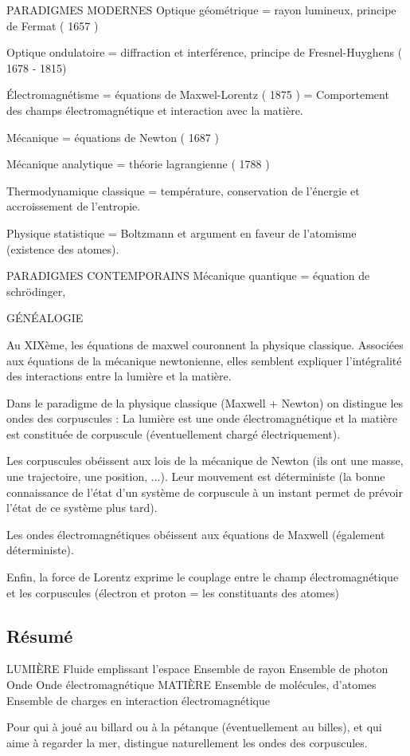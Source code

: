 PARADIGMES MODERNES
	Optique géométrique = rayon lumineux, principe de Fermat ( 1657 )

	Optique ondulatoire = diffraction et interférence, principe de Fresnel-Huyghens ( 1678 - 1815)

	Électromagnétisme =  équations de Maxwel-Lorentz ( 1875 ) = Comportement des champs électromagnétique et interaction avec la matière.

	Mécanique = équations de Newton ( 1687 )

	Mécanique analytique = théorie lagrangienne ( 1788 )

	Thermodynamique classique = température, conservation de l'énergie et accroissement de l'entropie.

	Physique statistique = Boltzmann et argument en faveur de l'atomisme (existence des atomes).


PARADIGMES CONTEMPORAINS
	Mécanique quantique = équation de schrödinger, 

GÉNÉALOGIE

Au XIXème, les équations de maxwel couronnent la physique classique. Associées aux équations de la mécanique newtonienne, elles semblent expliquer l'intégralité des interactions entre la lumière et la matière.

Dans le paradigme de la physique classique (Maxwell + Newton) on distingue les ondes des corpuscules : La lumière est une onde électromagnétique et la matière est constituée de corpuscule (éventuellement chargé électriquement).

Les corpuscules obéissent aux lois de la mécanique de Newton (ils ont une masse, une trajectoire, une position, ...). Leur mouvement est déterministe (la bonne connaissance de l'état d'un système de corpuscule à un instant permet de prévoir l'état de ce système plus tard).

Les ondes électromagnétiques obéissent aux équations de Maxwell (également déterministe).

Enfin, la force de Lorentz exprime le couplage entre le champ électromagnétique et les corpuscules (électron et proton = les constituants des atomes)




\subsection{Résumé}

LUMIÈRE
	Fluide emplissant l'espace
	Ensemble de rayon
	Ensemble de photon
	Onde
	Onde électromagnétique
MATIÈRE
	Ensemble de molécules, d'atomes
	Ensemble de charges en interaction électromagnétique
	

Pour qui à joué au billard ou à la pétanque (éventuellement au billes), et qui aime à regarder la mer, distingue naturellement les ondes des corpuscules.


\subsection{}
\begin{center}
\end{center}


